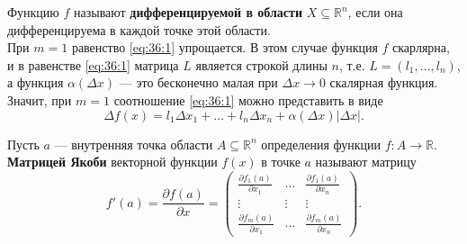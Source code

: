 \documentclass[12pt]{report}
\numberwithin{equation}{section}
\begin{document}
Функцию $f$ называют \textbf{дифференцируемой в области} $X \subseteq \mathbb{R}^n$, если она дифференцируема в каждой точке этой области.\\

При $m = 1$ равенство \eqref{eq:36:1} упрощается. В этом случае функция $f$ скарлярна, и в равенстве \eqref{eq:36:1} матрица $L$ является строкой длины $n$, т.е. $L = (l_1, \ldots, l_n)$, а функция $\alpha(\Delta x)$ --- это бесконечно малая при $\Delta x \to 0$ скалярная функция. Значит, при $m = 1$ соотношение \eqref{eq:36:1} можно представить в виде
\begin{equation} \label{eq:36:2}
\Delta f(x) = l_1 \Delta x_1 + \dots + l_n \Delta x_n + \alpha(\Delta x) |\Delta x|.
\end{equation}

Пусть $a$ --- внутренняя точка области $A \subseteq \mathbb{R}^n$ определения функции $f : A \to \mathbb{R}$. \textbf{Матрицей Якоби} векторной функции $f(x)$ в точке $a$ называют матрицу
\begin{equation} \label{eq:36:3}
f'(a) = \frac{\partial f(a)}{\partial x} = 
\begin{pmatrix}
\frac{\partial f_1(a)}{\partial x_1} & \dots & \frac{\partial f_1(a)}{\partial x_n}\\
\vdots & \vdots & \vdots\\
\frac{\partial f_m(a)}{\partial x_1} & \dots & \frac{\partial f_m(a)}{\partial x_n}
\end{pmatrix}.\end{equation}
\end{document}
